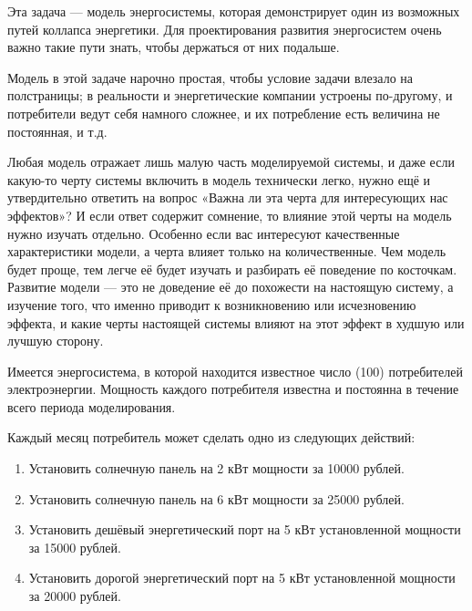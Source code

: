 
Эта задача — модель энергосистемы, которая демонстрирует один из возможных путей коллапса энергетики. Для проектирования развития энергосистем очень важно такие пути знать, чтобы держаться от них подальше.

Модель в этой задаче нарочно простая, чтобы условие задачи влезало на полстраницы; в реальности и энергетические компании устроены по-другому, и потребители ведут себя намного сложнее, и их потребление есть величина не постоянная, и т.д.

Любая модель отражает лишь малую часть моделируемой системы, и даже если какую-то черту системы включить в модель технически легко, нужно ещё и утвердительно ответить на вопрос «Важна ли эта черта для интересующих нас эффектов»? И если ответ содержит сомнение, то влияние этой черты на модель нужно изучать отдельно. Особенно если вас интересуют качественные характеристики модели, а черта влияет только на количественные. Чем модель будет проще, тем легче её будет изучать и разбирать её поведение по косточкам. Развитие модели — это не доведение её до похожести на настоящую систему, а изучение того, что именно приводит к возникновению или исчезновению эффекта, и какие черты настоящей системы влияют на этот эффект в худшую или лучшую сторону.

Имеется энергосистема, в которой находится известное число (100) потребителей электроэнергии.
Мощность каждого потребителя известна и постоянна в течение всего периода моделирования.

Каждый месяц потребитель может сделать одно из следующих действий:

\begin{enumerate}
    \item Установить солнечную панель на 2 кВт мощности за 10000 рублей.
    \item Установить солнечную панель на 6 кВт мощности за 25000 рублей.
    \item Установить дешёвый энергетический порт на 5 кВт установленной мощности за 15000 рублей.
    \item Установить дорогой энергетический порт на 5 кВт установленной мощности за 20000 рублей.    
\end{enumerate}

